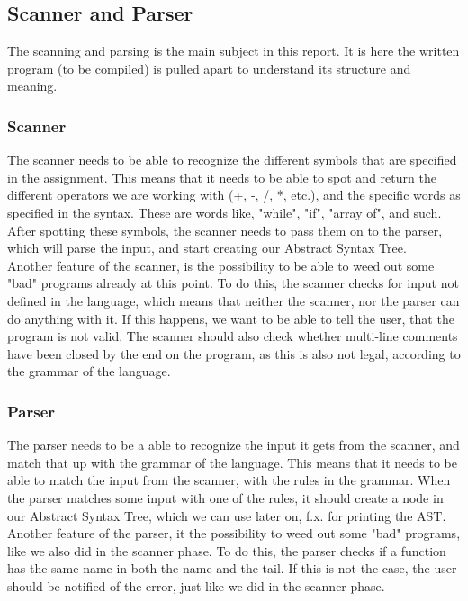 \documentclass[a4paper,10pt,titlepage]{report}
\begin{document}
\subsection{Scanner and Parser}
The scanning and parsing is the main subject in this report. It is here the written program (to be compiled) is pulled apart to understand its structure and meaning.
\subsubsection{Scanner}
The scanner needs to be able to recognize the different symbols that are specified in the assignment. This means that it needs to be able to spot and return the different operators we are working with (+, -, /, *, etc.), and the specific words as specified in the syntax. These are words like, "while", "if", "array of", and such. After spotting these symbols, the scanner needs to pass them on to the parser, which will parse the input, and start creating our Abstract Syntax Tree. \\
\vspace{6px}
Another feature of the scanner, is the possibility to be able to weed out some "bad" programs already at this point. To do this, the scanner checks for input not defined in the language, which means that neither the scanner, nor the parser can do anything with it. If this happens, we want to be able to tell the user, that the program is not valid. The scanner should also check whether multi-line comments have been closed by the end on the program, as this is also not legal, according to the grammar of the language.

\subsubsection{Parser}
The parser needs to be a able to recognize the input it gets from the scanner, and match that up with the grammar of the language. This means that it needs to be able to match the input from the scanner, with the rules in the grammar. When the parser matches some input with one of the rules, it should create a node in our Abstract Syntax Tree, which we can use later on, f.x. for printing the AST.\\
\vspace{6px}
Another feature of the parser, it the possibility to weed out some "bad" programs, like we also did in the scanner phase. To do this, the parser checks if a function has the same name in both the name and the tail. If this is not the case, the user should be notified of the error, just like we did in the scanner phase.
\end{document}
